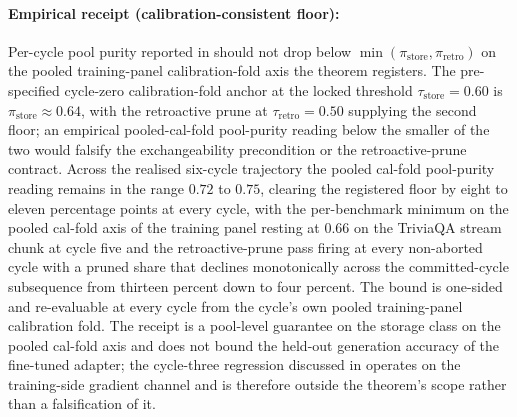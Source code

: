\paragraph{Empirical receipt (calibration-consistent floor):} Per-cycle pool purity reported in  should not drop below $\min(\pi_{\text{store}}, \pi_{\text{retro}})$ on the pooled training-panel calibration-fold axis the theorem registers. The pre-specified cycle-zero calibration-fold anchor at the locked threshold $\tau_{\text{store}}=0.60$ is $\pi_{\text{store}} \approx 0.64$, with the retroactive prune at $\tau_{\text{retro}}=0.50$ supplying the second floor; an empirical pooled-cal-fold pool-purity reading below the smaller of the two would falsify the exchangeability precondition or the retroactive-prune contract. Across the realised six-cycle trajectory the pooled cal-fold pool-purity reading remains in the range $0.72$ to $0.75$, clearing the registered floor by eight to eleven percentage points at every cycle, with the per-benchmark minimum on the pooled cal-fold axis of the training panel resting at $0.66$ on the TriviaQA stream chunk at cycle five and the retroactive-prune pass firing at every non-aborted cycle with a pruned share that declines monotonically across the committed-cycle subsequence from thirteen percent down to four percent. The bound is one-sided and re-evaluable at every cycle from the cycle's own pooled training-panel calibration fold. The receipt is a pool-level guarantee on the storage class on the pooled cal-fold axis and does not bound the held-out generation accuracy of the fine-tuned adapter; the cycle-three regression discussed in  operates on the training-side gradient channel and is therefore outside the theorem's scope rather than a falsification of it.

